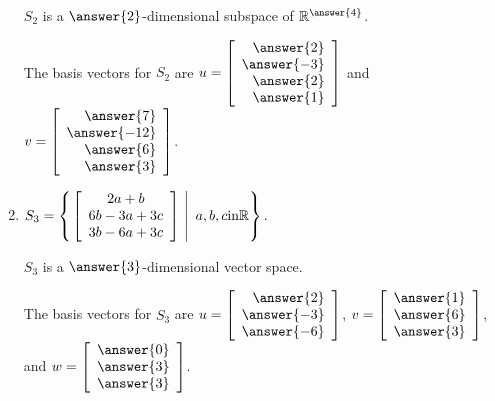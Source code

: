 \documentclass{ximera}
\begin{document}
\begin{exercise}
\begin{enumerate}
                $S_2$ is a $\answer{2}$-dimensional subspace of $\R^{\answer{4}}$.
    
                \begin{problem}
    
                  The basis vectors for $S_2$ are $u=\startmat{r} \answer{2} \\ \answer{-3} \\ \answer{2} \\ \answer{1} \stopmat$ and $v=\startmat{r} \answer{7} \\ \answer{-12} \\ \answer{6} \\ \answer{3} \stopmat$.
    
                \end{problem}
    
                \item $S_3 =
                \set{\left.\startmat{c}
                      2a+b \\
                      6b-3a+3c \\
                      3b-6a+3c
                    \stopmat ~\right\vert~a,b,c\text{in} \R}.$
          
                      $S_3$ is a $\answer{3}$-dimensional vector space.
          
                      \begin{problem}
          
                        The basis vectors for $S_3$ are $u=\startmat{r} 
                        \answer{2} \\ \answer{-3} \\ \answer{-6} \stopmat$, $v=\startmat{r} \answer{1} \\ \answer{6} \\ \answer{3} \stopmat$, and $w=\startmat{r} \answer{0} \\ \answer{3} \\ \answer{3} \stopmat$.
          
                      \end{problem}       

    \end{enumerate}    
    

\end{exercise}
\end{document}
